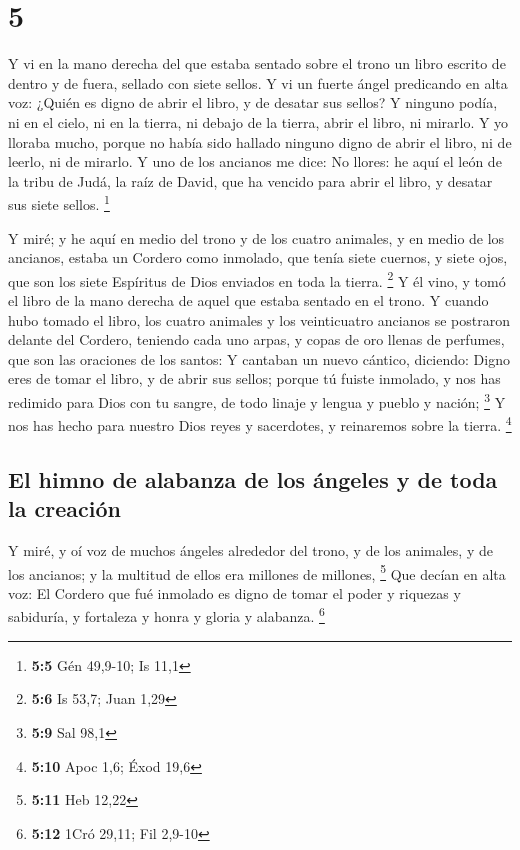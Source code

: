 \hypertarget{section-4}{%
\section{5}\label{section-4}}

 Y vi en la mano derecha del que estaba sentado sobre el
trono un libro escrito de dentro y de fuera, sellado con siete sellos.
 Y vi un fuerte ángel predicando en alta voz: ¿Quién es
digno de abrir el libro, y de desatar sus sellos?  Y ninguno
podía, ni en el cielo, ni en la tierra, ni debajo de la tierra, abrir el
libro, ni mirarlo.  Y yo lloraba mucho, porque no había sido
hallado ninguno digno de abrir el libro, ni de leerlo, ni de mirarlo.
 Y uno de los ancianos me dice: No llores: he aquí el león
de la tribu de Judá, la raíz de David, que ha vencido para abrir el
libro, y desatar sus siete sellos. \footnote{\textbf{5:5} Gén 49,9-10;
  Is 11,1}

 Y miré; y he aquí en medio del trono y de los cuatro
animales, y en medio de los ancianos, estaba un Cordero como inmolado,
que tenía siete cuernos, y siete ojos, que son los siete Espíritus de
Dios enviados en toda la tierra. \footnote{\textbf{5:6} Is 53,7; Juan
  1,29}  Y él vino, y tomó el libro de la mano derecha de
aquel que estaba sentado en el trono.  Y cuando hubo tomado
el libro, los cuatro animales y los veinticuatro ancianos se postraron
delante del Cordero, teniendo cada uno arpas, y copas de oro llenas de
perfumes, que son las oraciones de los santos:  Y cantaban
un nuevo cántico, diciendo: Digno eres de tomar el libro, y de abrir sus
sellos; porque tú fuiste inmolado, y nos has redimido para Dios con tu
sangre, de todo linaje y lengua y pueblo y nación; \footnote{\textbf{5:9}
  Sal 98,1}  Y nos has hecho para nuestro Dios reyes y
sacerdotes, y reinaremos sobre la tierra. \footnote{\textbf{5:10} Apoc
  1,6; Éxod 19,6}

\hypertarget{el-himno-de-alabanza-de-los-uxe1ngeles-y-de-toda-la-creaciuxf3n}{%
\subsection{El himno de alabanza de los ángeles y de toda la
creación}\label{el-himno-de-alabanza-de-los-uxe1ngeles-y-de-toda-la-creaciuxf3n}}

 Y miré, y oí voz de muchos ángeles alrededor del trono, y
de los animales, y de los ancianos; y la multitud de ellos era millones
de millones, \footnote{\textbf{5:11} Heb 12,22}  Que decían
en alta voz: El Cordero que fué inmolado es digno de tomar el poder y
riquezas y sabiduría, y fortaleza y honra y gloria y alabanza.
\footnote{\textbf{5:12} 1Cró 29,11; Fil 2,9-10}

